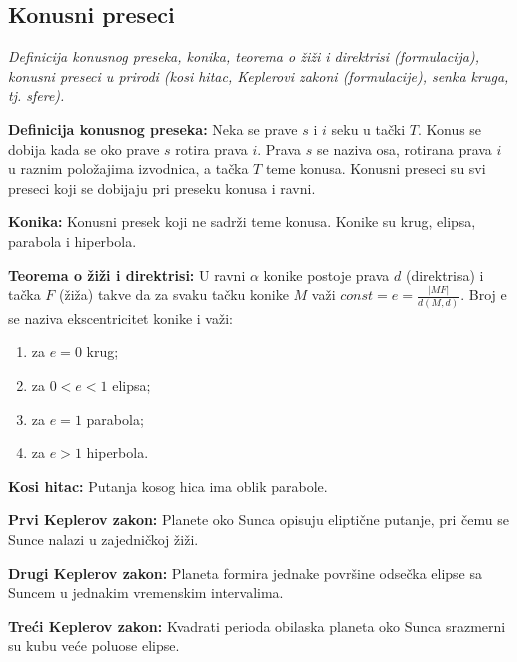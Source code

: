 \documentclass[12pt]{article}
\begin{document}
\subsection{Konusni preseci}
\textit{Definicija konusnog preseka, konika, teorema o žiži i
    direktrisi (formulacija), konusni preseci u prirodi (kosi hitac, Keplerovi
    zakoni (formulacije), senka kruga, tj. sfere).}
\par
\vspace*{1cm}

\textbf{Definicija konusnog preseka:} Neka se prave $s$ i $i$ seku u tački $T$.
Konus se dobija kada se oko prave $s$ rotira prava $i$. Prava $s$ se naziva
osa, rotirana prava $i$ u raznim položajima izvodnica, a tačka $T$ teme konusa.
Konusni preseci su svi preseci koji se dobijaju pri preseku konusa i ravni.
\par

\textbf{Konika:} Konusni presek koji ne sadrži teme konusa. Konike su krug,
elipsa, parabola i hiperbola.
\par

\textbf{Teorema o žiži i direktrisi:} U ravni $\alpha$ konike postoje prava $d$
(direktrisa) i tačka $F$ (žiža) takve da za svaku tačku konike $M$ važi
$const=e=\frac{|MF|}{d(M,d)}$. Broj e se naziva ekscentricitet konike i važi:
\begin{enumerate}[label=\textbf{(\arabic*)}]
    \item za $e=0$ krug;
    \item za $0<e<1$ elipsa;
    \item za $e=1$ parabola;
    \item za $e>1$ hiperbola.
\end{enumerate}
\par

\textbf{Kosi hitac:} Putanja kosog hica ima oblik parabole.
\par

\textbf{Prvi Keplerov zakon:} Planete oko Sunca opisuju eliptične putanje, pri
čemu se Sunce nalazi u zajedničkoj žiži.
\par

\textbf{Drugi Keplerov zakon:} Planeta formira jednake površine odsečka elipse
sa Suncem u jednakim vremenskim intervalima.
\par

\textbf{Treći Keplerov zakon:} Kvadrati perioda obilaska planeta oko Sunca
srazmerni su kubu veće poluose elipse.
\par
\end{document}
